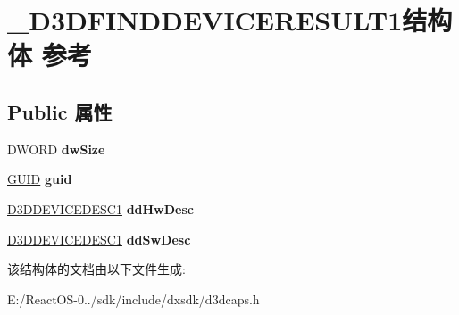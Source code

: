\hypertarget{struct___d3_d_f_i_n_d_d_e_v_i_c_e_r_e_s_u_l_t1}{}\section{\+\_\+\+D3\+D\+F\+I\+N\+D\+D\+E\+V\+I\+C\+E\+R\+E\+S\+U\+L\+T1结构体 参考}
\label{struct___d3_d_f_i_n_d_d_e_v_i_c_e_r_e_s_u_l_t1}
\subsection*{Public 属性}
\begin{DoxyCompactItemize}
\item 
\mbox{\label{struct___d3_d_f_i_n_d_d_e_v_i_c_e_r_e_s_u_l_t1_a405f7527832c3101cc00989527016a79}} 
D\+W\+O\+RD {\bfseries dw\+Size}
\item 
\mbox{\label{struct___d3_d_f_i_n_d_d_e_v_i_c_e_r_e_s_u_l_t1_ad511530aea742ae92cd8b2bb36a7cf07}} 
\hyperlink{interface_g_u_i_d}{G\+U\+ID} {\bfseries guid}
\item 
\mbox{\label{struct___d3_d_f_i_n_d_d_e_v_i_c_e_r_e_s_u_l_t1_ad37c4b7e4ea65da7106d905ea938e59b}} 
\hyperlink{struct___d3_d_device_desc1}{D3\+D\+D\+E\+V\+I\+C\+E\+D\+E\+S\+C1} {\bfseries dd\+Hw\+Desc}
\item 
\mbox{\label{struct___d3_d_f_i_n_d_d_e_v_i_c_e_r_e_s_u_l_t1_ad311f7c6eb7c36084768e8a20d6d5c94}} 
\hyperlink{struct___d3_d_device_desc1}{D3\+D\+D\+E\+V\+I\+C\+E\+D\+E\+S\+C1} {\bfseries dd\+Sw\+Desc}
\end{DoxyCompactItemize}


该结构体的文档由以下文件生成\+:\begin{DoxyCompactItemize}
\item 
E\+:/\+React\+O\+S-\/0../sdk/include/dxsdk/d3dcaps.\+h\end{DoxyCompactItemize}
